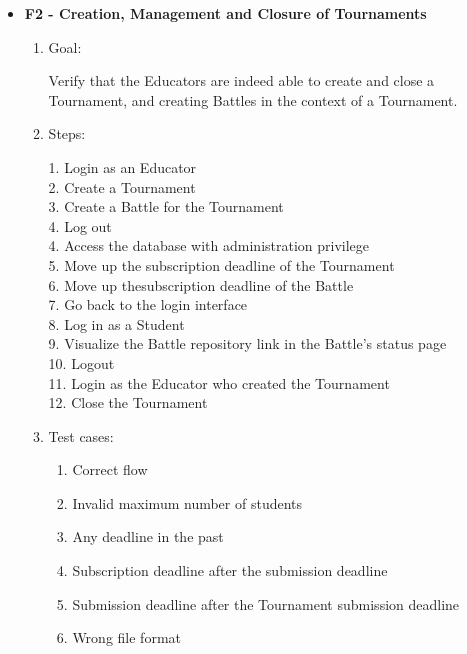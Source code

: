 \documentclass{Configuration_Files/Template}
\begin{document}
\begin{itemize}
    \item \textbf{F2 - Creation, Management and Closure of Tournaments}
    
    \begin{enumerate}
    
        \item Goal:
        
        Verify that the Educators are indeed able to create and close a Tournament, and creating Battles in the context of a Tournament.
        
        \item Steps:
        
            1. Login as an Educator\\
            2. Create a Tournament\\
            3. Create a Battle for the Tournament\\
            4. Log out\\
            4. Access the database with administration privilege\\
            5. Move up the subscription deadline of the Tournament\\
            6. Move up thesubscription deadline of the Battle\\
            7. Go back to the login interface\\
            8. Log in as a Student\\
            9. Visualize the Battle repository link in the Battle's status page\\
            10. Logout\\
            11. Login as the Educator who created the Tournament\\
            12. Close the Tournament 
        
        \item Test cases:
        
        \begin{enumerate}
        
            \item Correct flow
            \item Invalid maximum number of students
            \item Any deadline in the past
            \item Subscription deadline after the submission deadline
            \item Submission deadline after the Tournament submission deadline
            \item Wrong file format
    

\end{enumerate}
\end{enumerate}
\end{itemize}
\end{document}
